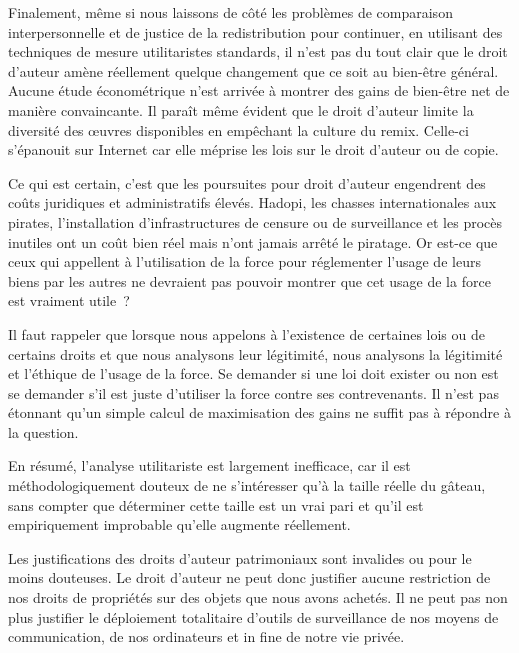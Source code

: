 Finalement, même si nous laissons de côté les problèmes de comparaison interpersonnelle et de justice de la redistribution pour continuer, en utilisant des techniques de mesure utilitaristes standards, il n'est pas du tout clair que le droit d'auteur amène réellement quelque changement que ce soit au bien-être général. Aucune étude économétrique n'est arrivée à montrer des gains de bien-être net de manière convaincante. Il paraît même évident que le droit d'auteur limite la diversité des œuvres disponibles en empêchant la culture du remix. Celle-ci s'épanouit sur Internet car elle méprise les lois sur le droit d'auteur ou de copie.

Ce qui est certain, c'est que les poursuites pour droit d'auteur engendrent des coûts juridiques et administratifs élevés. Hadopi, les chasses internationales aux pirates, l'installation d'infrastructures de censure ou de surveillance et les procès inutiles ont un coût bien réel mais n'ont jamais arrêté le piratage. Or est-ce que ceux qui appellent à l'utilisation de la force pour réglementer l'usage de leurs biens par les autres ne devraient pas pouvoir montrer que cet usage de la force est vraiment utile~?

Il faut rappeler que lorsque nous appelons à l'existence de certaines lois ou de certains droits et que nous analysons leur légitimité, nous analysons la légitimité et l'éthique de l'usage de la force. Se demander si une loi doit exister ou non est se demander s'il est juste d'utiliser la force contre ses contrevenants. Il n'est pas étonnant qu'un simple calcul de maximisation des gains ne suffit pas à répondre à la question. 

En résumé, l'analyse utilitariste est largement inefficace, car il est méthodologiquement douteux de ne s'intéresser qu'à la taille réelle du gâteau, sans compter que déterminer cette taille est un vrai pari et qu'il est empiriquement improbable qu'elle augmente réellement.

\vspace{3em}
Les justifications des droits d'auteur patrimoniaux sont invalides ou pour le moins douteuses. Le droit d'auteur ne peut donc justifier aucune restriction de nos droits de propriétés sur des objets que nous avons achetés. Il ne peut pas non plus justifier le déploiement totalitaire d'outils de surveillance de nos moyens de communication, de nos ordinateurs et in fine de notre vie privée.
